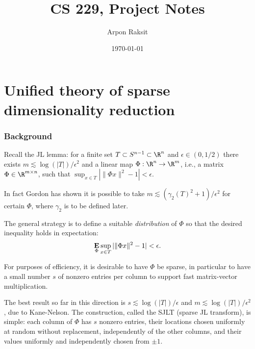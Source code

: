 


\title{CS 229, Project Notes}
\author{Arpon Raksit}
\date{\today}


\maketitle
\thispagestyle{fancy}


\part{Unified theory of sparse dimensionality reduction
  \cite{bourgain-2013}}


\section{Background}

Recall the JL lemma: for a finite set $T \subset S^{n-1} \subset \R^n$
and $\epsilon \in (0, 1/2)$ there exists $m \lesssim
\log(|T|)/\epsilon^2$ and a linear map $\Phi : \R^n \to \R^m$, i.e., a
matrix $\Phi \in \R^{m \times n}$, such that $\sup_{x \in T} |\|\Phi
x\|^2 - 1| < \epsilon$.

\medskip
In fact Gordon has shown it is possible to take $m \lesssim
(\gamma_2(T)^2+1)/\epsilon^2$ for certain $\Phi$, where $\gamma_2$ is
to be defined later.

\medskip
The general strategy is to define a suitable \emph{distribution} of
$\Phi$ so that the desired inequality holds in expectation:
\begin{equation}
  \label{dist-JL}
  \operatorname*{\mathbf{E}}_\Phi \sup_{x \in T} |\|\Phi x\|^2 - 1| < \epsilon.
\end{equation}

\medskip
For purposes of efficiency, it is desirable to have $\Phi$ be sparse,
in particular to have a small number $s$ of nonzero entries per column
to support fast matrix-vector multiplication.

\medskip
The best result so far in this direction is $s \lesssim
\log(|T|)/\epsilon$ and $m \lesssim \log(|T|)/\epsilon^2$, due to
Kane-Nelson. The construction, called the SJLT (sparse JL transform),
is simple: each column of $\Phi$ has $s$ nonzero entries, their
locations chosen uniformly at random without replacement,
independently of the other columns, and their values uniformly and
independently chosen from $\pm 1$.


